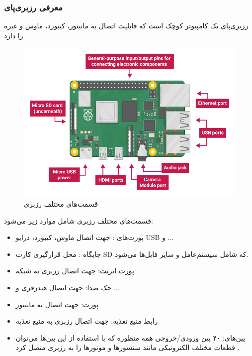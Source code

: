 \documentclass[12pt]{article}
\begin{document}
\subsubsection{معرفی رزبری‌پای }

رزبری‌پای یک کامپیوتر کوچک است که قابلیت اتصال به مانیتور، کیبورد، ماوس و غیره را دارد.

\begin{figure}[h]
	\begin{center}
		\includegraphics[width=.70\textwidth]{pi-labelled-names} %
	\end{center}
	\caption{قسمت‌های مختلف رزبری \cite{1}}
\end{figure}



قسمت‌های مختلف رزبری شامل موارد زیر می‌شود:

\begin{itemize}
	\item 
	پورت‌های :  جهت اتصال ماوس، کیبورد، درایو USB و ...
	\item 
	
	جایگاه : محل قرارگیری کارت SD که شامل سیستم‌عامل و سایر فایل‌ها می‌شود.
	\item 
	
	پورت اترنت: جهت اتصال رزبری به شبکه
	
	\item 
	جک صدا: جهت اتصال هندزفری و ...
	\item 
	
	پورت:  جهت اتصال به مانیتور
	\item 
رابط منبع تغذیه: جهت اتصال رزبری به منبع تغذیه
	
	\item
	پین‌های: 
	 ۴۰ پین ورودی/خروجی همه منظوره که با استفاده از این پین‌ها می‌توان قطعات مختلف الکترونیکی مانند سنسورها و موتورها را به رزبری متصل کرد \cite{2}.
\end{itemize}
\end{document}

